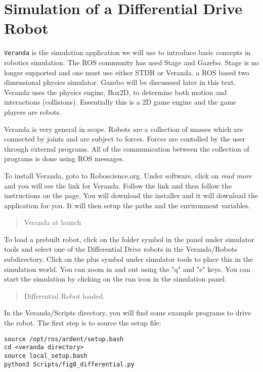\hypertarget{simulation-of-a-differential-drive-robot}{%
\section{Simulation of a Differential Drive
Robot}\label{simulation-of-a-differential-drive-robot}}

\texttt{Veranda} is the simulation application we will use to introduce
basic concepts in robotics simulation. The ROS community has used Stage
and Gazebo. Stage is no longer supported and one must use either STDR or
Veranda. a ROS based two dimensional physics simulator. Gazebo will be
discusssed later in this text. Veranda uses the physics engine, Box2D,
to determine both motion and interactions (collisions). Essentially this
is a 2D game engine and the game players are robots.

Veranda is very general in scope. Robots are a collection of masses
which are connected by joints and are subject to forces. Forces are
contolled by the user through external programs. All of the
communication between the collection of programs is done using ROS
messages.

To install Veranda, goto to Roboscience.org. Under software, click on
\emph{read more} and you will see the link for Veranda. Follow the link
and then follow the instructions on the page. You will download the
installer and it will download the application for you. It will then
setup the paths and the environment variables.

\begin{quote}
Veranda at launch
\end{quote}

To load a prebuilt robot, click on the folder symbol in the panel under
simulator tools and select one of the Differential Drive robots in the
Veranda/Robots subdirectory. Click on the plus symbol under simulator
tools to place this in the simulation world. You can zoom in and out
using the "q" and "e" keys. You can start the simulation by clicking on
the run icon in the simulation panel.

\begin{quote}
Differential Robot loaded.
\end{quote}

In the Veranda/Scripts directory, you will find some example programs to
drive the robot. The first step is to source the setup file:

\begin{verbatim}
source /opt/ros/ardent/setup.bash
cd <veranda directory>
source local_setup.bash
python3 Scripts/fig8_differential.py
\end{verbatim}

